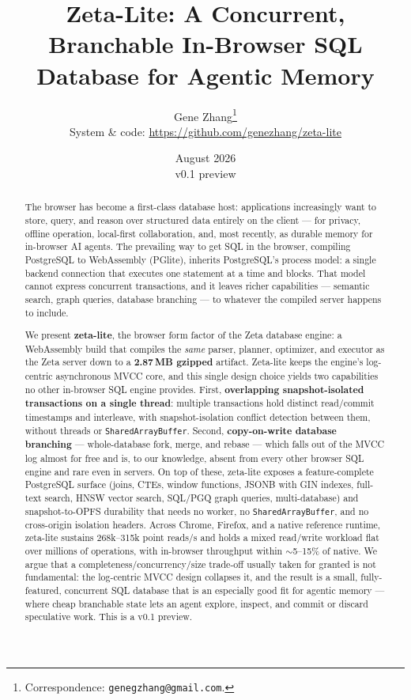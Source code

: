 \documentclass[11pt]{article}
\title{\vspace{-1.5em}\bfseries Zeta-Lite: A Concurrent, Branchable In-Browser SQL
Database for Agentic Memory}
\author{Gene Zhang\thanks{Correspondence: \texttt{genegzhang@gmail.com}.}\\[0.4em]
\normalsize System \& code: \url{https://github.com/genezhang/zeta-lite}}
\date{August 2026 \\[0.3em]\normalsize v0.1 preview}
\begin{document}
\maketitle

\begin{abstract}
\noindent
The browser has become a first-class database host: applications increasingly
want to store, query, and reason over structured data entirely on the client ---
for privacy, offline operation, local-first collaboration, and, most recently, as
durable memory for in-browser AI agents. The prevailing way to get SQL in the
browser, compiling PostgreSQL to WebAssembly (PGlite), inherits PostgreSQL's
process model: a single backend connection that executes one statement at a time
and blocks. That model cannot express concurrent transactions, and it leaves
richer capabilities --- semantic search, graph queries, database branching --- to
whatever the compiled server happens to include.

We present \textbf{zeta-lite}, the browser form factor of the Zeta database
engine: a WebAssembly build that compiles the \emph{same} parser, planner,
optimizer, and executor as the Zeta server down to a \textbf{2.87\,MB gzipped}
artifact. Zeta-lite keeps the engine's log-centric asynchronous MVCC core, and
this single design choice yields two capabilities no other in-browser SQL engine
provides. First, \textbf{overlapping snapshot-isolated transactions on a single
thread}: multiple transactions hold distinct read/commit timestamps and
interleave, with snapshot-isolation conflict detection between them, without
threads or \texttt{SharedArrayBuffer}. Second, \textbf{copy-on-write database
branching} --- whole-database fork, merge, and rebase --- which falls out of the
MVCC log almost for free and is, to our knowledge, absent from every other browser
SQL engine and rare even in servers. On top of these, zeta-lite exposes a
feature-complete PostgreSQL surface (joins, CTEs, window functions, JSONB with GIN
indexes, full-text search, HNSW vector search, SQL/PGQ graph queries,
multi-database) and snapshot-to-OPFS durability that needs no worker, no
\texttt{SharedArrayBuffer}, and no cross-origin isolation headers. Across Chrome,
Firefox, and a native reference runtime, zeta-lite sustains 268k--315k point
reads/s and holds a mixed read/write workload flat over millions of operations,
with in-browser throughput within $\sim$5--15\% of native. We argue that a
completeness/concurrency/size trade-off usually taken for granted is not
fundamental: the log-centric MVCC design collapses it, and the result is a small,
fully-featured, concurrent SQL database that is an especially good fit for agentic
memory --- where cheap branchable state lets an agent explore, inspect, and commit
or discard speculative work. This is a v0.1 preview.
\end{abstract}
\end{document}
